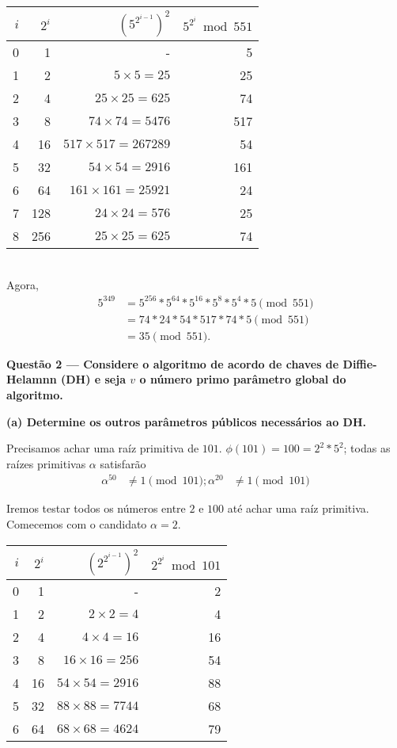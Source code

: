 \documentclass{article}
\begin{document}
\begin{tabular}{r r r r}
    $i$ & $2^i$ & $(5^{2^{i-1}})^2$ & $5^{2^i} \bmod 551$ \\
    \toprule
    0 & 1 & - & 5 \\
    1 & 2 & $5 \times 5 = 25$ & 25 \\
    2 & 4 & $25 \times 25 = 625$ & 74 \\
    3 & 8 & $74 \times 74 = 5476$ & 517 \\
    4 & 16 & $517 \times 517 = 267289$ & 54 \\
    5 & 32 & $54 \times 54 = 2916$ & 161 \\
    6 & 64 & $161 \times 161 = 25921$ & 24 \\
    7 & 128 & $24 \times 24 = 576$ & 25 \\
    8 & 256 & $25 \times 25 = 625$ & 74 \\
\end{tabular}
\\[1em]
Agora,
\begin{align*}
    5^{349} &= 5^{256} * 5^{64} * 5^{16} * 5^8 * 5^4 * 5 \pmod{551} \\
            &= 74 * 24 * 54 * 517 * 74 * 5 \pmod{551} \\
            &= 35 \pmod{551}.
\end{align*}

\textbf{
    Questão 2 ---
    Considere o algoritmo de acordo de chaves de Diffie-Helamnn (DH)
    e seja $v$ o número primo parâmetro global do algoritmo.
}

\textbf{
    (a)  Determine os outros parâmetros públicos necessários ao DH.
}

Precisamos achar uma raíz primitiva de $101$.
$\phi(101) = 100 = 2^2 * 5^2$;
todas as raízes primitivas $\alpha$ satisfarão
\begin{align*}
    \alpha^{50} &\neq 1 \pmod{101};
    \alpha^{20} &\neq 1 \pmod{101}
\end{align*}

Iremos testar todos os números entre $2$ e $100$ até achar uma raíz primitiva.
Comecemos com o candidato $\alpha = 2$.

\begin{tabular}{r r r r}
    $i$ & $2^i$ & $(2^{2^{i-1}})^2$ & $2^{2^i} \bmod 101$ \\
    \toprule
    0 & 1 & - & 2 \\
    1 & 2 & $2 \times 2 = 4$ & 4 \\
    2 & 4 & $4 \times 4 = 16$ & 16 \\
    3 & 8 & $16 \times 16 = 256$ & 54 \\
    4 & 16 & $54 \times 54 = 2916$ & 88 \\
    5 & 32 & $88 \times 88 = 7744$ & 68 \\
    6 & 64 & $68 \times 68 = 4624$ & 79 \\
\end{tabular}
\end{document}

